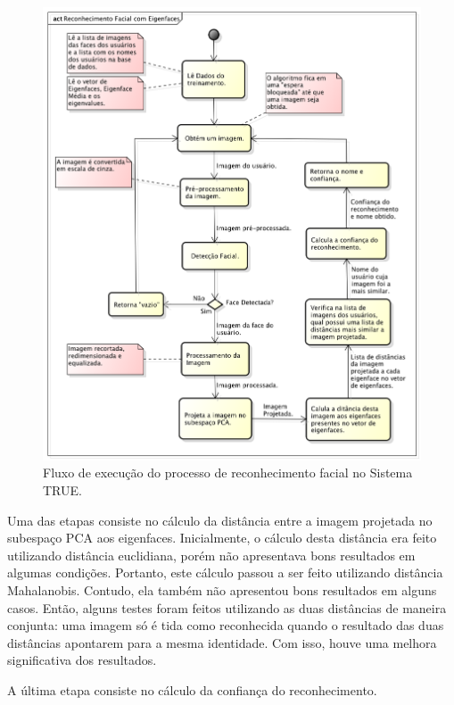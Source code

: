 			\begin{figure}[H]
			\begin{center}
				\includegraphics[scale=0.5]{figuras/4.ProblemaEProposta/diagrama-reconhecimento.png}
			\end{center}
			\caption{Fluxo de execução do processo de reconhecimento facial no Sistema TRUE.}
			\label{fig:diagrama-reconhecimento}
		\end{figure}

		Uma das etapas consiste no cálculo da distância entre a imagem projetada no
		subespaço PCA aos eigenfaces. Inicialmente, o cálculo desta distância era
		feito utilizando distância euclidiana, porém não apresentava bons resultados
		em algumas condições. Portanto, este cálculo passou a ser feito utilizando
		distância Mahalanobis. Contudo, ela também não apresentou bons resultados em
		alguns casos. Então, alguns testes foram feitos utilizando as duas distâncias
		de maneira conjunta: uma imagem só é tida como reconhecida quando o resultado
		das duas distâncias apontarem para a mesma identidade. Com isso, houve uma
		melhora significativa dos resultados.

		A última etapa consiste no cálculo da confiança do reconhecimento. 
		


